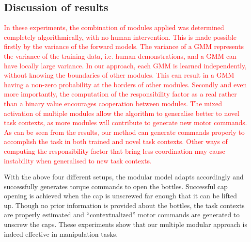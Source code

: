 \subsection{Discussion of results}
\textcolor{red}{In these experiments, the %
  combination of modules applied was determined completely
  algorithmically, with no human intervention. This is made possible
  firstly by the
  variance of the forward models. The variance of a GMM represents the
  variance of the training data, i.e. human demonstrations, and a GMM
  can have locally large variance.  In our approach, each GMM is
  learned independently, without knowing the boundaries of other
  modules. This can result in a GMM having a non-zero probability at the
  borders of other modules. Secondly and even more importantly, the
  computation of the responsibility factor as a real rather than a
  binary value encourages
  cooperation between modules.  The mixed activation of multiple
  modules allow the algorithm to generalise  better
  to novel task contexts, as more modules will contribute to generate
  new motor commands. As can be seen from the results, our method can
  generate commands properly to accomplish the task in both trained
  and novel task contexts. Other ways of computing the responsibility
  factor that bring less coordination may cause instability when
  generalised to new task contexts. }


With the above four different setups, the modular model adapts
accordingly and successfully generates torque commands to open the
bottles. Successful cap opening is achieved when the cap is unscrewed
far enough that it can be lifted up. Though no prior information is
provided about the bottles, the task contexts are properly estimated
and ``contextualized'' motor commands are generated to unscrew the
caps. These experiments show that our multiple modular approach is
indeed effective in manipulation tasks.



